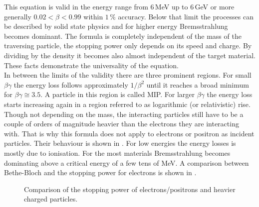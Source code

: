 \documentclass[british,11pt,a4paper]{memoir}
\begin{document}
This equation is valid in the energy range from $6\,$MeV up to $6\,$GeV or more generally $0.02 < \beta < 0.99$ within $1\,$\% accuracy. Below that limit the processes can be described by solid state physics and for higher energy Bremsstrahlung becomes dominant. The formula is completely independent of the mass of the traversing particle, the stopping power only depends on its speed and charge. By dividing by the density it becomes also almost independent of the target material. These facts demonstrate the universality of the equation.\\
In between the limits of the validity there are three prominent regions. For small $\beta\gamma$ the energy loss follows approximately $1/\beta^2$ until it reaches a broad minimum for $\beta\gamma \cong 3.5 $. A particle in this region is called \ac{MIP}. For larger $\beta\gamma$ the energy loss starts increasing again in a region referred to as logarithmic (or relativistic) rise.\\
Though not depending on the mass, the interacting particles still have to be a couple of orders of magnitude heavier than the electrons they are interacting with. That is why this formula does not apply to electrons or positron as incident particles. Their behaviour is shown in . For low energies the energy losses is mostly due to ionisation. For the most materials Bremsstrahlung becomes dominating above a critical energy of a few tens of MeV. A comparison between Bethe-Bloch and the stopping power for electrons is shown in .
\begin{figure}[ht]
	\centering
	\hfill
	\caption{Comparison of the stopping power of electrons/positrons and heavier charged particles.}
	\label{pcomp}
\end{figure}\no
\end{document}
